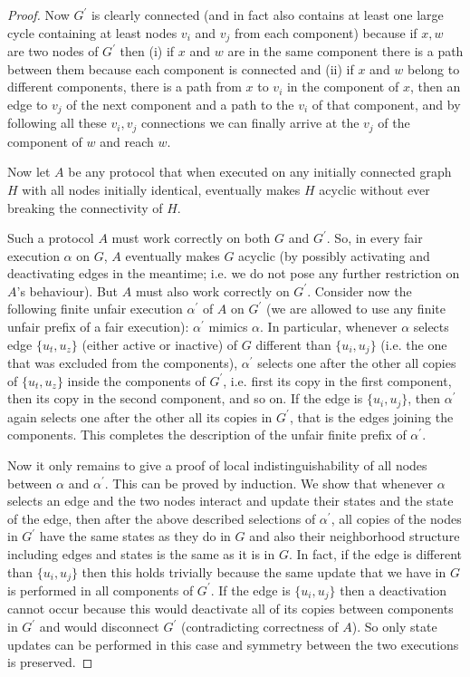 \documentclass[preprint]{elsarticle}
\begin{document}
\begin{proof}
Now $G^\prime$ is clearly connected (and in fact also contains at least one large
cycle containing at least nodes $v_i$ and $v_j$ from each component) because if
$x,w$ are two nodes of $G^\prime$ then (i) if $x$ and $w$ are in the same component there is
a path between them because each component is connected and (ii) if $x$ and
$w$ belong to different components, there is a path from $x$ to $v_i$ in the
component of $x$, then an edge to $v_j$ of the next component and a path to the
$v_i$ of that component, and by following all these $v_i,v_j$ connections we can
finally arrive at the $v_j$ of the component of $w$ and reach $w$.

Now let $A$ be any protocol that when executed on any initially connected
graph $H$ with all nodes initially identical, eventually makes $H$ acyclic
without ever breaking the connectivity of $H$.

Such a protocol $A$ must work correctly on both $G$ and $G^\prime$. So, in every fair
execution $\alpha$ on $G$, $A$ eventually makes $G$ acyclic (by possibly activating and
deactivating edges in the meantime; i.e. we do not pose any further
restriction on $A$'s behaviour). But $A$ must also work correctly on $G^\prime$.
Consider now the following finite unfair execution $\alpha^\prime$ of $A$ on $G^\prime$ (we are
allowed to use any finite unfair prefix of a fair execution): $\alpha^\prime$ mimics $\alpha$.
In particular, whenever $\alpha$ selects edge $\{u_t,u_z\}$ (either active or
inactive) of $G$ different than $\{u_i,u_j\}$ (i.e. the one that was excluded from
the components), $\alpha^\prime$ selects one after the other all copies of $\{u_t,u_z\}$
inside the components of $G^\prime$, i.e. first its copy in the first component,
then its copy in the second component, and so on. If the edge is
$\{u_i,u_j\}$, then $\alpha^\prime$ again selects one after the other all its copies in $G^\prime$,
that is the edges joining the components. This completes the description
of the unfair finite prefix of $\alpha^\prime$.

Now it only remains to give a proof of local indistinguishability of all
nodes between $\alpha$ and $\alpha^\prime$. This can be proved by induction. We show that
whenever $\alpha$ selects an edge and the two nodes interact and update their
states and the state of the edge, then after the above described
selections of $\alpha^\prime$, all copies of the nodes in $G^\prime$ have the same states as
they do in $G$ and also their neighborhood structure including edges and
states is the same as it is in $G$. In fact, if the edge is different than
$\{u_i,u_j\}$ then this holds trivially because the same update that we have in
$G$ is performed in all components of $G^\prime$. If the edge is $\{u_i,u_j\}$ then a
deactivation cannot occur because this would deactivate all of its copies
between components in $G^\prime$ and would disconnect $G^\prime$ (contradicting
correctness of $A$). So only state updates can be performed in this case and
symmetry between the two executions is preserved.


\end{proof}
\end{document}

